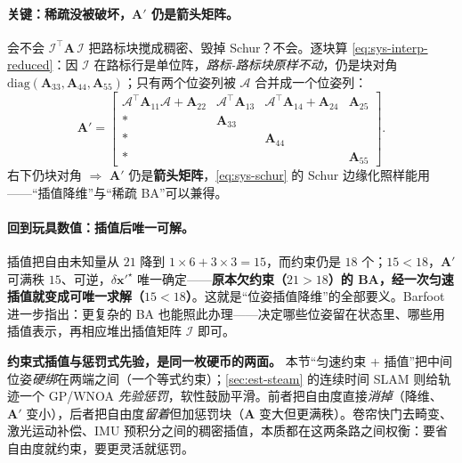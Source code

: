 \paragraph{关键：稀疏没被破坏，$\mathbf{A}'$ 仍是箭头矩阵。}
会不会 $\boldsymbol{\mathcal{I}}^\top\mathbf{A}\,\boldsymbol{\mathcal{I}}$ 把路标块搅成稠密、毁掉 Schur？不会。逐块算 \cref{eq:sys-interp-reduced}：因 $\boldsymbol{\mathcal{I}}$ 在路标行是单位阵，\emph{路标-路标块原样不动}，仍是块对角 $\mathrm{diag}(\mathbf{A}_{33},\mathbf{A}_{44},\mathbf{A}_{55})$；只有两个位姿列被 $\boldsymbol{\mathcal{A}}$ 合并成一个位姿列：
\begin{equation}
\mathbf{A}'=
\begin{bmatrix}
\boldsymbol{\mathcal{A}}^\top\mathbf{A}_{11}\boldsymbol{\mathcal{A}}+\mathbf{A}_{22}
 & \boldsymbol{\mathcal{A}}^\top\mathbf{A}_{13} & \boldsymbol{\mathcal{A}}^\top\mathbf{A}_{14}+\mathbf{A}_{24} & \mathbf{A}_{25}\\
\ast & \mathbf{A}_{33} & & \\
\ast & & \mathbf{A}_{44} & \\
\ast & & & \mathbf{A}_{55}
\end{bmatrix}.
\label{eq:sys-interp-Aprime}
\end{equation}
右下仍块对角 $\Rightarrow$ $\mathbf{A}'$ 仍是\textbf{箭头矩阵}，\cref{eq:sys-schur} 的 Schur 边缘化照样能用——“插值降维”与“稀疏 BA”可以兼得。

\paragraph{回到玩具数值：插值后唯一可解。}
插值把自由未知量从 $21$ 降到 $1\times6+3\times3=15$，而约束仍是 $18$ 个；$15<18$，$\mathbf{A}'$ 可满秩 $15$、可逆，$\delta\mathbf{x}'^\star$ 唯一确定——\textbf{原本欠约束（$21>18$）的 BA，经一次匀速插值就变成可唯一求解（$15<18$）}。这就是“位姿插值降维”的全部要义。Barfoot 进一步指出：更复杂的 BA 也能照此办理——决定哪些位姿留在状态里、哪些用插值表示，再相应堆出插值矩阵 $\boldsymbol{\mathcal{I}}$ 即可。

\begin{insight}
\textbf{约束式插值与惩罚式先验，是同一枚硬币的两面。}
本节“匀速约束 + 插值”把中间位姿\emph{硬绑}在两端之间（一个等式约束）；\cref{sec:est-steam} 的连续时间 SLAM 则给轨迹一个 GP/WNOA \emph{先验惩罚}，软性鼓励平滑。前者把自由度直接\emph{消掉}（降维、$\mathbf{A}'$ 变小），后者把自由度\emph{留着}但加惩罚块（$\mathbf{A}$ 变大但更满秩）。卷帘快门去畸变、激光运动补偿、IMU 预积分之间的稠密插值，本质都在这两条路之间权衡：要省自由度就约束，要更灵活就惩罚。
\end{insight}

